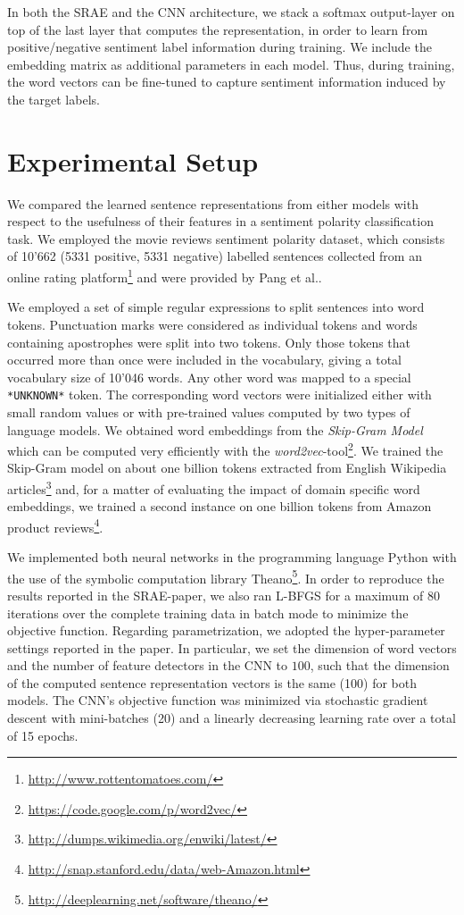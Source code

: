 \documentclass{llncs}
\begin{document}
In both the SRAE and the CNN architecture, we stack a softmax output-layer on top of the last layer that computes the representation, in order to learn from positive/negative sentiment label information during training. We include the embedding matrix as additional parameters in each model. Thus, during training, the word vectors can be fine-tuned to capture sentiment information induced by the target labels.

\section{Experimental Setup}
\label{sec:exp}
We compared the learned sentence representations from either models with respect to the usefulness of their features in a sentiment polarity classification task. We employed the movie reviews  sentiment polarity dataset, which consists of 10'662 (5331 positive, 5331 negative) labelled sentences collected from an online rating platform\footnote{\url{http://www.rottentomatoes.com/}} and were provided by Pang et al.\cite{bopang}.

We employed a set of simple regular expressions to split sentences into word tokens. Punctuation marks were considered as individual tokens and words containing apostrophes were split into two tokens.  Only those tokens that occurred more than once were included in the vocabulary, giving a total vocabulary size of 10'046 words. Any other word was mapped to a special \texttt{*UNKNOWN*} token. The corresponding word vectors were initialized either with small random values or with pre-trained values computed by two types of language models. We obtained word embeddings from the 
\emph{Skip-Gram Model}\cite{mikolov} which can be computed very efficiently with the \emph{word2vec}-tool\footnote{\url{https://code.google.com/p/word2vec/}}. We trained the Skip-Gram model on about one billion tokens extracted from English Wikipedia articles\footnote{\url{http://dumps.wikimedia.org/enwiki/latest/}} and, for a matter of evaluating the impact of domain specific word embeddings, we trained a second instance on one billion tokens from Amazon product reviews\footnote{\url{http://snap.stanford.edu/data/web-Amazon.html}}.

We implemented both neural networks in the programming language Python with the use of the symbolic computation library Theano\footnote{\url{http://deeplearning.net/software/theano/}}. In order to reproduce the results reported in the SRAE-paper, we also ran L-BFGS for a maximum of 80 iterations over the complete training data in batch mode to minimize the objective function. Regarding parametrization, we adopted the hyper-parameter settings reported in the paper. In particular, we set the dimension of word vectors and the number of feature detectors in the CNN to $100$, such that the dimension of the computed sentence representation vectors is the same (100) for both models. The CNN's objective function was minimized via stochastic gradient descent with mini-batches (20) and a linearly decreasing learning rate over a total of 15 epochs.
\end{document}
